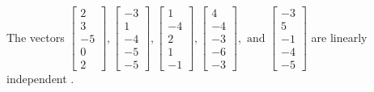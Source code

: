\begin{exercise}
\begin{exerciseStatement}
  \end{exerciseStatement}
  \begin{exerciseAnswer}
   The vectors \(\left[\begin{array}{r}
2 \\
3 \\
-5 \\
0 \\
2
\end{array}\right] , \left[\begin{array}{r}
-3 \\
1 \\
-4 \\
-5 \\
-5
\end{array}\right] , \left[\begin{array}{r}
1 \\
-4 \\
2 \\
1 \\
-1
\end{array}\right] , \left[\begin{array}{r}
4 \\
-4 \\
-3 \\
-6 \\
-3
\end{array}\right] , \text{ and } \left[\begin{array}{r}
-3 \\
5 \\
-1 \\
-4 \\
-5
\end{array}\right]\) are 
  	 linearly independent  .
  


  \end{exerciseAnswer}
\end{exercise}
